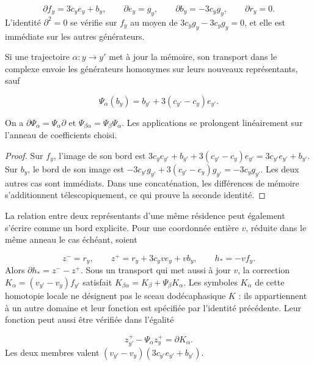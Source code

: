 \[
\partial f_y=3c_y e_y+b_y,\qquad
\partial e_y=g_y,\qquad
\partial b_y=-3c_y g_y,\qquad
\partial r_y=0.
\]
L'identité \(\partial^2=0\) se vérifie sur \(f_y\) au moyen de \(3c_yg_y-3c_yg_y=0\), et elle est immédiate sur les autres générateurs.

Si une trajectoire \(\alpha:y\to y'\) met à jour la mémoire, son transport dans le complexe envoie les générateurs homonymes sur leurs nouveaux représentants, sauf

\[
\Psi_\alpha(b_y)=b_{y'}+3(c_{y'}-c_y)e_{y'}.
\]
\begin{proposition}
\label{x_reciprocidad:iv:cont:memoria-natural}
On a \(\partial\Psi_\alpha=\Psi_\alpha\partial\) et \(\Psi_{\beta\alpha}=\Psi_\beta\Psi_\alpha\). Les applications se prolongent linéairement sur l'anneau de coefficients choisi.

\end{proposition}
\begin{proof}
Sur \(f_y\), l'image de son bord est \(3c_ye_{y'}+b_{y'}+3(c_{y'}-c_y)e_{y'} =3c_{y'}e_{y'}+b_{y'}\). Sur \(b_y\), le bord de son image est \(-3c_{y'}g_{y'}+3(c_{y'}-c_y)g_{y'}=-3c_yg_{y'}\). Les deux autres cas sont immédiats. Dans une concaténation, les différences de mémoire s'additionnent télescopiquement, ce qui prouve la seconde identité.
\end{proof}

La relation entre deux représentants d'une même résidence peut également s'écrire comme un bord explicite. Pour une coordonnée entière \(v\), réduite dans le même anneau le cas échéant, soient

\[
z^-=r_y,\qquad z^+=r_y+3c_yv e_y+v b_y,
\qquad h_*=-vf_y.
\]
Alors \(\partial h_*=z^--z^+\). Sous un transport qui met aussi à jour \(v\), la correction \(K_\alpha=(v_{y'}-v_y)f_{y'}\) satisfait \(K_{\beta\alpha}=K_\beta+\Psi_\beta K_\alpha\). Les symboles \(K_\alpha\) de cette homotopie locale ne désignent pas le sceau dodécaphasique \(K\) : ils appartiennent à un autre domaine et leur fonction est spécifiée par l'identité précédente. Leur fonction peut aussi être vérifiée dans l'égalité

\[
z^+_{y'}-\Psi_\alpha z^+_y=\partial K_\alpha.
\]
Les deux membres valent \((v_{y'}-v_y)(3c_{y'}e_{y'}+b_{y'})\).

